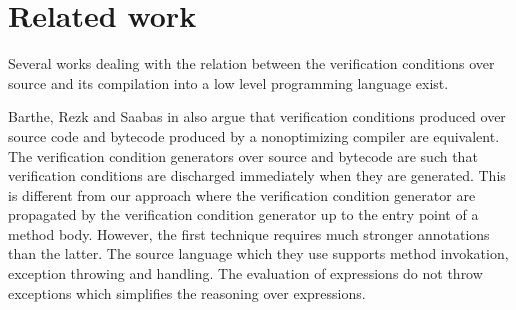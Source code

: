 \section{Related work}\label{pog:relWork}


Several works dealing with the relation between the 
verification conditions over source and its compilation into a low  level  programming  language exist.

Barthe, Rezk and Saabas in \cite{gta05:fast} also argue that verification conditions produced
over source code and bytecode produced by a nonoptimizing compiler   are equivalent.
 The verification condition generators over source and bytecode are such that verification conditions
are discharged immediately when they are generated. This is different from our approach where the
 verification condition generator are propagated by the verification condition generator
 up to the entry point of a method body. However, the first technique requires much stronger
 annotations than the latter. The source language which they use supports method invokation, exception throwing and handling.
The evaluation of expressions do not throw exceptions   which simplifies the reasoning over expressions.



